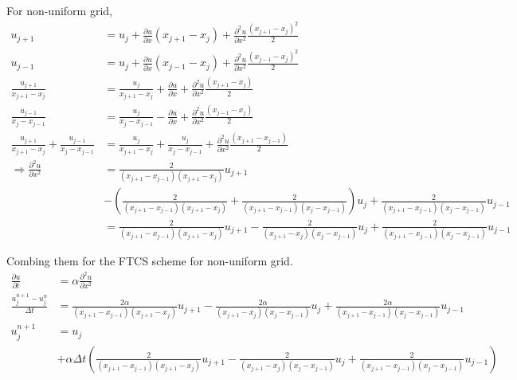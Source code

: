 \documentclass[letterpaper,10pt]{article}
\begin{document}
For non-uniform grid, 
\begin{align*}
  u_{j+1}&=u_j + \frac{\partial u}{\partial x}(x_{j+1}-x_j)+\frac{\partial^2 u}{\partial x^2}\frac{(x_{j+1}-x_j)^2}{2}\\
  u_{j-1}&=u_j + \frac{\partial u}{\partial x}(x_{j-1}-x_j)+\frac{\partial^2 u}{\partial x^2}\frac{(x_{j-1}-x_j)^2}{2}\\
  \frac{u_{j+1}}{x_{j+1}-x_j}&=\frac{u_j}{x_{j+1}-x_j}+\frac{\partial u}{\partial x}+\frac{\partial^2 u}{\partial x^2}\frac{(x_{j+1}-x_j)}{2}\\
  \frac{u_{j-1}}{x_j-x_{j-1}}&=\frac{u_j}{x_j-x_{j-1}}-\frac{\partial u}{\partial x}+\frac{\partial^2 u}{\partial x^2}\frac{(x_{j-1}-x_j)}{2}\\
  \frac{u_{j+1}}{x_{j+1}-x_j}+\frac{u_{j-1}}{x_j-x_{j-1}}&=\frac{u_j}{x_{j+1}-x_j}+\frac{u_j}{x_j-x_{j-1}}+\frac{\partial^2 u}{\partial x^2}\frac{(x_{j+1}-x_{j-1})}{2}\\
  \Rightarrow \frac{\partial^2 u}{\partial x^2}&=\frac{2}{(x_{j+1}-x_{j-1})(x_{j+1}-x_j)}u_{j+1}\\
  &-\left(\frac{2}{(x_{j+1}-x_{j-1})(x_{j+1}-x_j)}+\frac{2}{(x_{j+1}-x_{j-1})(x_j-x_{j-1})}\right)u_j+\frac{2}{(x_{j+1}-x_{j-1})(x_j-x_{j-1})}u_{j-1}\\
  &=\frac{2}{(x_{j+1}-x_{j-1})(x_{j+1}-x_j)}u_{j+1}-\frac{2}{(x_{j+1}-x_{j})(x_j-x_{j-1})}u_j+\frac{2}{(x_{j+1}-x_{j-1})(x_j-x_{j-1})}u_{j-1}
\end{align*}

Combing them for the FTCS scheme for non-uniform grid. 
\begin{align*}
  \frac{\partial u}{\partial t}&=\alpha\frac{\partial^2 u}{\partial x^2}\\
  \frac{u_j^{n+1}-u_j^n}{\Delta t}&=\frac{2\alpha}{(x_{j+1}-x_{j-1})(x_{j+1}-x_j)}u_{j+1}-\frac{2\alpha}{(x_{j+1}-x_{j})(x_j-x_{j-1})}u_j+\frac{2\alpha}{(x_{j+1}-x_{j-1})(x_j-x_{j-1})}u_{j-1}\\
  u_j^{n+1}&=u_j\\
  &+\alpha \Delta t\left(\frac{2}{(x_{j+1}-x_{j-1})(x_{j+1}-x_j)}u_{j+1}-\frac{2}{(x_{j+1}-x_{j})(x_j-x_{j-1})}u_j+\frac{2}{(x_{j+1}-x_{j-1})(x_j-x_{j-1})}u_{j-1}\right)
\end{align*}
\end{document}
